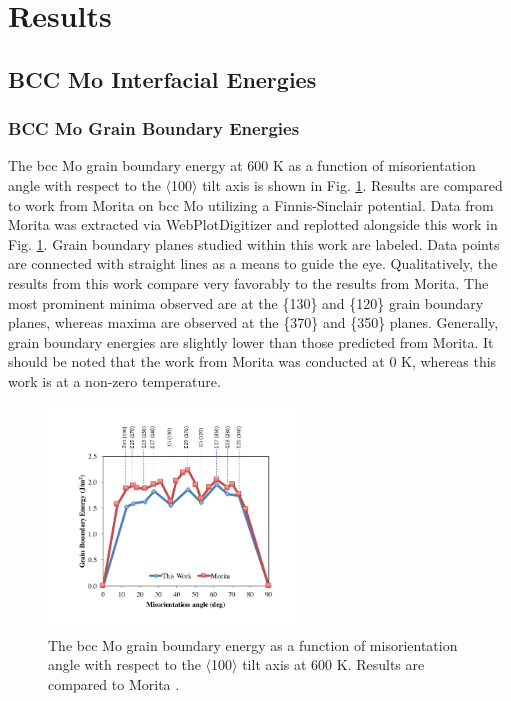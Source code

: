 \documentclass[review]{elsarticle}
\begin{document}
\section{Results}
\subsection{BCC Mo Interfacial Energies}

\subsubsection{BCC Mo Grain Boundary Energies}

The bcc Mo grain boundary energy at 600 K as a function of misorientation angle with respect to the $\langle$100$\rangle$ tilt axis is shown in Fig. \ref{fig:mo600}. Results are compared to work from Morita \cite{morita1997} on bcc Mo utilizing a Finnis-Sinclair \cite{finnis} potential. Data from Morita \cite{morita1997} was extracted via WebPlotDigitizer \cite{webplot} and replotted alongside this work in Fig. \ref{fig:mo600}. Grain boundary planes studied within this work are labeled. Data points are connected with straight lines as a means to guide the eye. Qualitatively, the results from this work compare very favorably to the results from Morita. The most prominent minima observed are at the \{130\} and \{120\} grain boundary planes, whereas maxima are observed at the \{370\} and \{350\} planes. Generally, grain boundary energies are slightly lower than those predicted from Morita. It should be noted that the work from Morita was conducted at 0 K, whereas this work is at a non-zero temperature. 

\begin{figure}[h]
 \centering
 \includegraphics[width=0.6\textwidth]{mo600B.png} 
 \caption{The bcc Mo grain boundary energy as a function of misorientation angle with respect to the $\langle$100$\rangle$ tilt axis at 600 K. Results are compared to Morita \cite{morita1997}.}
 \label{fig:mo600}
\end{figure}
\end{document}
